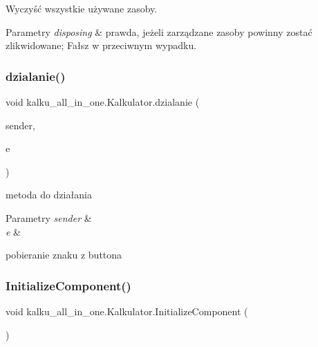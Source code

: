 Wyczyść wszystkie używane zasoby. 


\begin{DoxyParams}{Parametry}
{\em disposing} & prawda, jeżeli zarządzane zasoby powinny zostać zlikwidowane; Fałsz w przeciwnym wypadku.\\
\hline
\end{DoxyParams}
\mbox{\label{classkalku__all__in__one_1_1_kalkulator_ae6ecdb5e2624e2d7b85e40fbb72c71d0}} 
\subsubsection{\texorpdfstring{dzialanie()}{dzialanie()}}
{\footnotesize\ttfamily void kalku\+\_\+all\+\_\+in\+\_\+one.\+Kalkulator.\+dzialanie (\begin{DoxyParamCaption}\item[{object}]{sender,  }\item[{Event\+Args}]{e }\end{DoxyParamCaption})}



metoda do działania 


\begin{DoxyParams}{Parametry}
{\em sender} & \\
\hline
{\em e} & \\
\hline
\end{DoxyParams}
pobieranie znaku z buttona \mbox{\label{classkalku__all__in__one_1_1_kalkulator_a93058ddd473ac42a3bc101b648b0e3fe}} 
\subsubsection{\texorpdfstring{InitializeComponent()}{InitializeComponent()}}
{\footnotesize\ttfamily void kalku\+\_\+all\+\_\+in\+\_\+one.\+Kalkulator.\+Initialize\+Component (\begin{DoxyParamCaption}{ }\end{DoxyParamCaption})\hspace{0.3cm}{\ttfamily [private]}}



